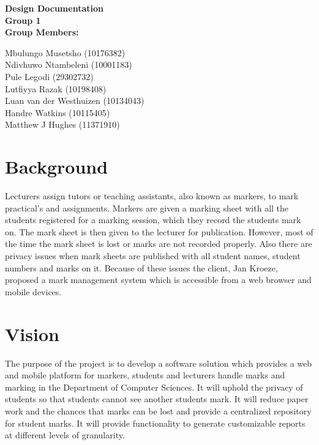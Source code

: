 \documentclass[12pt]{article}
\newcommand{\Title}{Design Documentation} %
\begin{document}
	\vspace{4em}
	
	\begin{center}%
	
	  \LARGE \bf \Title \\[4em]
	  \LARGE {\bf Group 1}\\[1em]
	  \LARGE {\bf Group Members:}\\[2em]
	  \large
	
	     Mbulungo Musetsho				(10176382) \\[1em]
	     Ndivhuwo Ntambeleni			(10001183) \\[1em]
	     Pule Legodi                    (29302732) \\[1em]
	     Lutfiyya Razak					(10198408) \\[1em]
	     Luan van der Westhuizen 		(10134043) \\[1em]
	     Handre Watkins					(10115405) \\[1em]
	     Matthew J Hughes				(11371910) \\[1em]
	
	\end{center}%
	

	\newpage
	\tableofcontents
	
	\newpage
	\section{Background}
		Lecturers assign tutors or teaching assistants, also known as markers, 
		to mark practical’s and assignments. Markers are given a marking sheet 
		with all the students registered for a marking session, which they 
		record the students mark on. The mark sheet is then given to the lecturer
		for publication. However, most of the time the mark sheet is lost or marks
		are not recorded properly. Also there are privacy issues when mark sheets
		are published with all student names, student numbers and marks on it. 
		Because of these issues the client, Jan Kroeze, proposed a mark 
		management system which is accessible from a web browser and mobile devices.
	
		\vspace{0.2in}
	
		
		
	
	\section{Vision}
	The purpose of the project is to develop a software solution which provides
a web and mobile platform for markers, students and lecturers handle marks
and marking in the Department of Computer Sciences. It will uphold the
privacy of students so that students cannot see another students mark. It will
reduce paper work and the chances that marks can be lost and provide a
centralized repository for student marks. It will provide functionality to
generate customizable reports at different levels of granularity.
		\vspace{0.2in}
		
\end{document}
